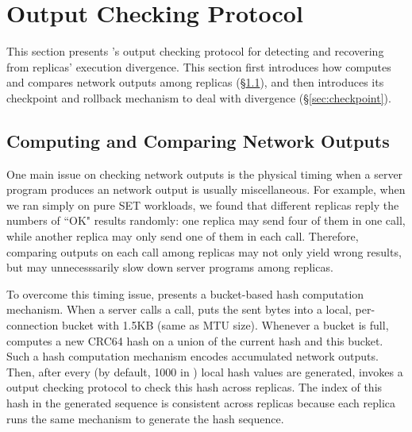 \section{Output Checking Protocol} \label{sec:output}

This section presents \xxx's output checking protocol for detecting and 
recovering from replicas' execution divergence. This section first introduces 
how \xxx computes and compares network outputs among replicas 
(\S\ref{sec:output-workflow}), and then introduces its checkpoint and rollback 
mechanism to deal with divergence (\S\ref{sec:checkpoint}).

\subsection{Computing and Comparing Network Outputs} \label{sec:output-workflow}

One main issue on checking network outputs is the physical timing when a 
server program produces an network output is usually miscellaneous. For 
example, when we ran \redis simply on pure SET workloads, we found that 
different replicas reply the numbers of ``OK" results randomly: one replica may 
send four of them in one \send call, while another replica may only send one of 
them in each \send call. Therefore, comparing outputs on each \send call among 
replicas may not only yield wrong results, but may unnecesssarily slow down 
server programs among replicas.

To overcome this timing issue, \xxx presents a bucket-based hash computation 
mechanism. When a server calls a \send call, \xxx puts the sent bytes into a 
local, per-connection bucket with 1.5KB (same as MTU size). Whenever a bucket 
is full, \xxx computes a new CRC64 hash on a union of the current hash and this 
bucket. Such a hash computation mechanism encodes accumulated network outputs. 
Then, after every \thashcomp (by default, 1000 in \xxx) local hash values are 
generated, \xxx invokes a output checking protocol to check this hash across 
replicas. The index of this hash in the generated sequence is consistent across 
replicas because each replica runs the same mechanism to generate the hash 
sequence.


